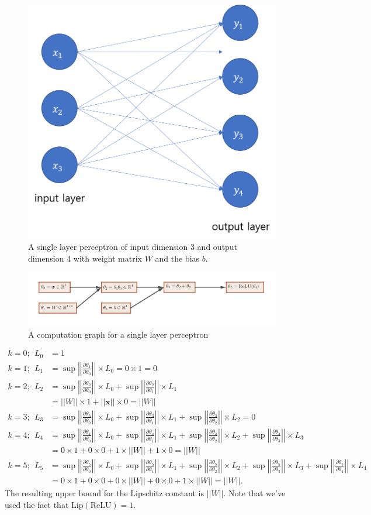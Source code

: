 \documentclass[11pt]{report}
\newcommand\bx{\ensuremath{\boldsymbol x}}
\newcommand\lip{\ensuremath{\text{Lip}}}
\newcommand\norm[1]{\ensuremath{\left|\left|#1\right|\right|}}
\begin{document}
\begin{figure}[h]
\centering
\includegraphics[width=.4\textwidth]{SLP}
\caption{A single layer perceptron of input dimension 3 and output dimension 4 with weight matrix \(W\) and the bias \(b\).}
\label{SLP}
\end{figure}

\begin{figure}[h]
\centering
\includegraphics[width=\textwidth]{computation_graph_2}
\caption{A computation graph for a single layer perceptron}
\label{computation_graph_2}
\end{figure}

\begin{align*}
k=0;\:\: L_0&=1\\
k=1;\:\: L_1&=\sup\norm{\frac{\partial\theta_1}{\partial\theta_0}}\times L_0=0\times1=0\\
k=2;\:\: L_2&
=\sup\norm{\frac{\partial\theta_2}{\partial\theta_0}}\times L_0
+\sup\norm{\frac{\partial\theta_2}{\partial\theta_1}}\times L_1\\
&=||W||\times1+||\bx||\times0=||W||\\
k=3;\:\: L_3&
=\sup\norm{\frac{\partial\theta_3}{\partial\theta_0}}\times L_0
+\sup\norm{\frac{\partial\theta_3}{\partial\theta_1}}\times L_1
+\sup\norm{\frac{\partial\theta_3}{\partial\theta_2}}\times L_2=0\\
k=4;\:\: L_4&
=\sup\norm{\frac{\partial\theta_4}{\partial\theta_0}}\times L_0
+\sup\norm{\frac{\partial\theta_4}{\partial\theta_1}}\times L_1
+\sup\norm{\frac{\partial\theta_4}{\partial\theta_2}}\times L_2
+\sup\norm{\frac{\partial\theta_4}{\partial\theta_3}}\times L_3\\
&=0\times1+0\times0+1\times||W||+1\times0=||W||\\
k=5;\:\: L_5&
=\sup\norm{\frac{\partial\theta_5}{\partial\theta_0}}\times L_0
+\sup\norm{\frac{\partial\theta_5}{\partial\theta_1}}\times L_1
+\sup\norm{\frac{\partial\theta_5}{\partial\theta_2}}\times L_2
+\sup\norm{\frac{\partial\theta_5}{\partial\theta_3}}\times L_3
+\sup\norm{\frac{\partial\theta_5}{\partial\theta_4}}\times L_4\\
&=0\times1+0\times0+0\times||W||+0\times0+1\times||W||=||W||.
\end{align*}
The resulting upper bound for the Lipschitz constant is \(||W||\).
Note that we've used the fact that \(\lip(\text{ReLU})=1\).
\end{document}

